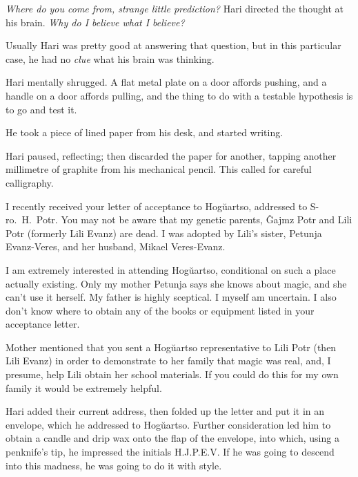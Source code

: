 \emph{Where do you come from, strange little prediction?} Hari directed the thought at his brain. \emph{Why do I believe what I believe?}

Usually Hari was pretty good at answering that question, but in this particular case, he had no \emph{clue} what his brain was thinking.

Hari mentally shrugged. A flat metal plate on a door affords pushing, and a handle on a door affords pulling, and the thing to do with a testable hypothesis is to go and test it.

He took a piece of lined paper from his desk, and started writing.

\begin{writtenNote}
\end{writtenNote}

Hari paused, reflecting; then discarded the paper for another, tapping another millimetre of graphite from his mechanical pencil. This called for careful calligraphy.

\begin{writtenNote}


I recently received your letter of acceptance to Hogŭartso, addressed to S\nobreakdash-ro.~H.~Potr. You may not be aware that my genetic parents, Ĝajmz Potr and Lili Potr (formerly Lili Evanz) are dead. I was adopted by Lili’s sister, Petunja Evanz-Veres, and her husband, Mikael Veres-Evanz.

I am extremely interested in attending Hogŭartso, conditional on such a place actually existing. Only my mother Petunja says she knows about magic, and she can’t use it herself. My father is highly sceptical. I myself am uncertain. I also don’t know where to obtain any of the books or equipment listed in your acceptance letter.

Mother mentioned that you sent a Hogŭartso representative to Lili Potr (then Lili Evanz) in order to demonstrate to her family that magic was real, and, I presume, help Lili obtain her school materials. If you could do this for my own family it would be extremely helpful.

\end{writtenNote}

Hari added their current address, then folded up the letter and put it in an envelope, which he addressed to Hogŭartso. Further consideration led him to obtain a candle and drip wax onto the flap of the envelope, into which, using a penknife’s tip, he impressed the initials H.J.P.E.V\@. If he was going to descend into this madness, he was going to do it with style.

